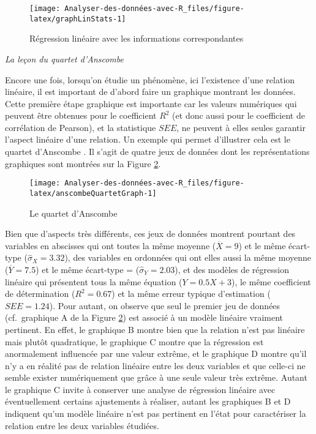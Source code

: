 \documentclass[
  french,
]{book}
\begin{document}
\begin{figure}

{\centering \texttt{[image: Analyser-des-données-avec-R\_files/figure-latex/graphLinStats-1]} 

}

\caption{Régression linéaire avec les informations correspondantes}\label{fig:graphLinStats}
\end{figure}

\emph{La leçon du quartet d'Anscombe}

Encore une fois, lorsqu'on étudie un phénomène, ici l'existence d'une relation linéaire, il est important de d'abord faire un graphique montrant les données. Cette première étape graphique est importante car les valeurs numériques qui peuvent être obtenues pour le coefficient \(R^2\) (et donc aussi pour le coefficient de corrélation de Pearson), et la statistique \(SEE\), ne peuvent à elles seules garantir l'aspect linéaire d'une relation. Un exemple qui permet d'illustrer cela est le quartet d'Anscombe \autocite*{anscombeGraphsStatisticalAnalysis1973}. Il s'agit de quatre jeux de données dont les représentations graphiques sont montrées sur la Figure \ref{fig:anscombeQuartetGraph}.

\begin{figure}

{\centering \texttt{[image: Analyser-des-données-avec-R\_files/figure-latex/anscombeQuartetGraph-1]} 

}

\caption{Le quartet d'Anscombe}\label{fig:anscombeQuartetGraph}
\end{figure}

Bien que d'aspects très différents, ces jeux de données montrent pourtant des variables en abscisses qui ont toutes la même moyenne (\(\overline{X} = 9\)) et le même écart-type (\(\hat{\sigma}_{X} = 3.32\)), des variables en ordonnées qui ont elles aussi la même moyenne (\(\overline{Y} = 7.5\)) et le même écart-type = (\(\hat{\sigma}_{Y} = 2.03\)), et des modèles de régression linéaire qui présentent tous la même équation (\(Y = 0.5X + 3\)), le même coefficient de détermination (\(R^2 = 0.67\)) et la même erreur typique d'estimation (\(SEE = 1.24\)). Pour autant, on observe que seul le premier jeu de données (cf.~graphique A de la Figure \ref{fig:anscombeQuartetGraph}) est associé à un modèle linéaire vraiment pertinent. En effet, le graphique B montre bien que la relation n'est pas linéaire mais plutôt quadratique, le graphique C montre que la régression est anormalement influencée par une valeur extrême, et le graphique D montre qu'il n'y a en réalité pas de relation linéaire entre les deux variables et que celle-ci ne semble exister numériquement que grâce à une seule valeur très extrême. Autant le graphique C invite à conserver une analyse de régression linéaire avec éventuellement certains ajustements à réaliser, autant les graphiques B et D indiquent qu'un modèle linéaire n'est pas pertinent en l'état pour caractériser la relation entre les deux variables étudiées.
\end{document}
